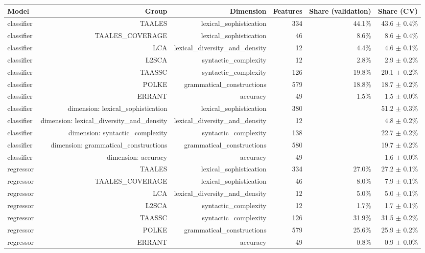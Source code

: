 \begin{table}[t]
\centering
\small
\begin{tabular}{lrrrrr}
\toprule
Model & Group & Dimension & Features & Share (validation) & Share (CV) \\
\midrule
classifier & TAALES & lexical\_sophistication & 334 & 44.1\% & 43.6 $\pm$ 0.4\% \\
classifier & TAALES\_COVERAGE & lexical\_sophistication & 46 & 8.6\% & 8.6 $\pm$ 0.4\% \\
classifier & LCA & lexical\_diversity\_and\_density & 12 & 4.4\% & 4.6 $\pm$ 0.1\% \\
classifier & L2SCA & syntactic\_complexity & 12 & 2.8\% & 2.9 $\pm$ 0.2\% \\
classifier & TAASSC & syntactic\_complexity & 126 & 19.8\% & 20.1 $\pm$ 0.2\% \\
classifier & POLKE & grammatical\_constructions & 579 & 18.8\% & 18.7 $\pm$ 0.2\% \\
classifier & ERRANT & accuracy & 49 & 1.5\% & 1.5 $\pm$ 0.0\% \\
classifier & dimension: lexical\_sophistication & lexical\_sophistication & 380 &  & 51.2 $\pm$ 0.3\% \\
classifier & dimension: lexical\_diversity\_and\_density & lexical\_diversity\_and\_density & 12 &  & 4.8 $\pm$ 0.2\% \\
classifier & dimension: syntactic\_complexity & syntactic\_complexity & 138 &  & 22.7 $\pm$ 0.2\% \\
classifier & dimension: grammatical\_constructions & grammatical\_constructions & 580 &  & 19.7 $\pm$ 0.2\% \\
classifier & dimension: accuracy & accuracy & 49 &  & 1.6 $\pm$ 0.0\% \\
regressor & TAALES & lexical\_sophistication & 334 & 27.0\% & 27.2 $\pm$ 0.1\% \\
regressor & TAALES\_COVERAGE & lexical\_sophistication & 46 & 8.0\% & 7.9 $\pm$ 0.1\% \\
regressor & LCA & lexical\_diversity\_and\_density & 12 & 5.0\% & 5.0 $\pm$ 0.1\% \\
regressor & L2SCA & syntactic\_complexity & 12 & 1.7\% & 1.7 $\pm$ 0.1\% \\
regressor & TAASSC & syntactic\_complexity & 126 & 31.9\% & 31.5 $\pm$ 0.2\% \\
regressor & POLKE & grammatical\_constructions & 579 & 25.6\% & 25.9 $\pm$ 0.2\% \\
regressor & ERRANT & accuracy & 49 & 0.8\% & 0.9 $\pm$ 0.0\% \\

\end{tabular}
\end{table}

